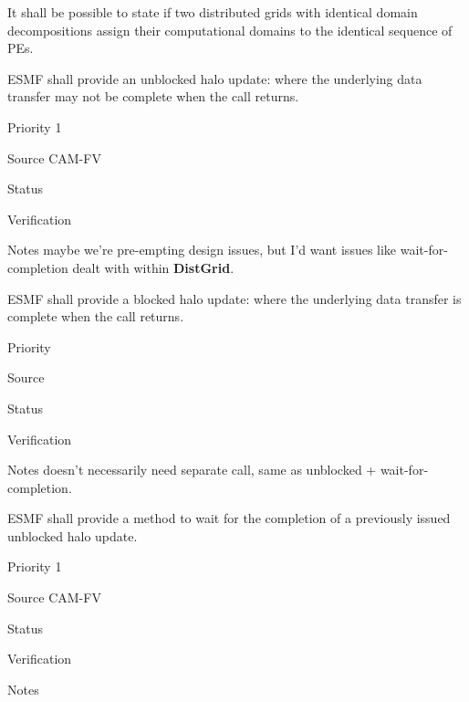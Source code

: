 
It shall be possible to state if two distributed grids with identical
domain decompositions assign their computational domains to the
identical sequence of PEs.

 \label{DG:halo}


ESMF shall provide an unblocked halo update: where the underlying
data transfer may not be complete when the call returns.

\begin{reqlist}
\item[Priority] 1
\item[Source] CAM-FV
\item[Status]
\item[Verification]
\item[Notes] maybe we're pre-empting design issues, but I'd want
  issues like wait-for-completion dealt with within \textbf{DistGrid}.
\end{reqlist}


ESMF shall provide a blocked halo update: where the underlying
data transfer is complete when the call returns.

\begin{reqlist}
\item[Priority]
\item[Source]
\item[Status]
\item[Verification]
\item[Notes] doesn't necessarily need separate call, same as unblocked
  + wait-for-completion.
\end{reqlist}


ESMF shall provide a method to wait for the completion of a previously
issued unblocked halo update.

\begin{reqlist}
\item[Priority] 1
\item[Source] CAM-FV
\item[Status]
\item[Verification]
\item[Notes]
\end{reqlist}


